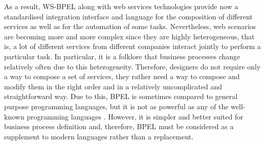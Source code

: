 As a result, WS-BPEL along with web services technologies provide now a standardised integration interface 
and language for the composition of different services as well as for the automation of some tasks. 
Nevertheless, web scenarios are becoming more and more complex since they are highly heterogeneous, that is, a lot of different
services from different companies interact jointly to perform a particular task. In particular, it is a folklore 
that business processes change relatively often due to this heterogeneity. Therefore, designers 
do not require only a way to compose a set of services, they rather
need a way to compose and modify them in the right order and in a relatively 
uncomplicated and straightforward way. Due to this, BPEL is sometimes compared 
to general purpose programming languages, but it
is not as powerful as any of the well-known programming languages \cite{}. However, 
it is simpler and better suited for business
process definition and, therefore, BPEL must be considered as a supplement to
modern languages rather than a replacement.




